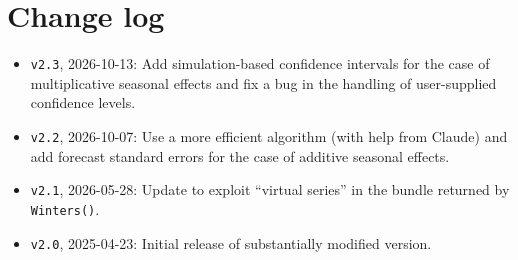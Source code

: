 \documentclass{article}
\begin{document}
\section{Change log}
\label{sec:log}

\begin{itemize}
\item \texttt{v2.3}, 2026-10-13: Add simulation-based confidence
  intervals for the case of multiplicative seasonal effects and fix a
  bug in the handling of user-supplied confidence levels.
\item \texttt{v2.2}, 2026-10-07: Use a more efficient algorithm (with
  help from Claude) and add forecast standard errors for the case of
  additive seasonal effects.
\item \texttt{v2.1}, 2026-05-28: Update to exploit ``virtual series'' in
  the bundle returned by \texttt{Winters()}.
\item \texttt{v2.0}, 2025-04-23: Initial release of substantially
  modified version.
\end{itemize}



\end{document}
